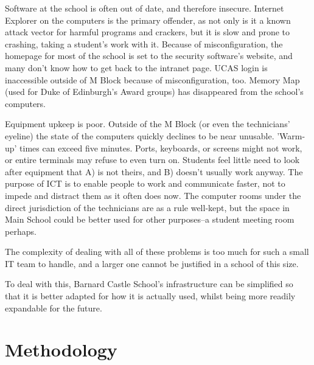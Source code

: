 \documentclass[a4paper,leqno,titlepage]{article}
\begin{document}
Software at the school is often out of date, and therefore insecure.
Internet Explorer on the computers is the primary offender, as not only is it
a known attack vector for harmful programs and crackers, but it is slow and
prone to crashing, taking a student's work with it. Because of misconfiguration,
the homepage for most of the school is set to the security software's website,
and many don't know how to get back to the intranet page. UCAS login is
inaccessible outside of M Block because of misconfiguration, too. Memory Map
(used for Duke of Edinburgh's Award groups) has disappeared from the school's
computers.


Equipment upkeep is poor. Outside of the M Block (or even the
technicians' eyeline) the state of the computers quickly declines to be near
unusable. 'Warm-up' times can exceed five minutes. Ports, keyboards, or screens
might not work, or entire terminals may refuse to even turn on.
Students feel little need to look after equipment that A) is not theirs,
and B) doesn't usually work anyway. The purpose of ICT is to enable
people to work and communicate faster, not to impede and distract them as it
often does now. The computer rooms under the direct jurisdiction of the
technicians are as a rule well-kept, but the space in Main School could be
better used for other purposes--a student meeting room perhaps.


The complexity of dealing with all of these problems is too much for such a
small IT team to handle, and a larger one cannot be justified in a school of
this size.


To deal with this, Barnard Castle School's infrastructure can be simplified
so that it is better adapted for how it is actually used, whilst being more
readily expandable for the future.




\section{Methodology}
\end{document}

